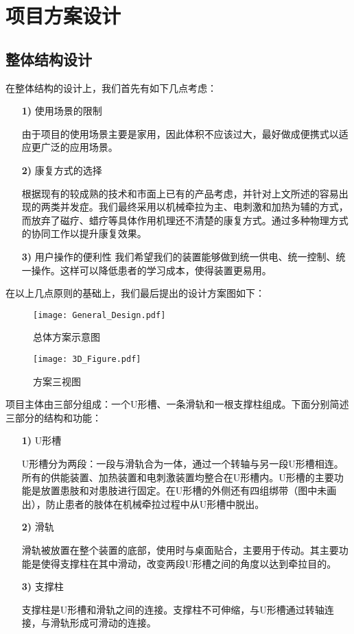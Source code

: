\documentclass[UTF8]{ctexart}
\begin{document}
\section{项目方案设计}
    \subsection{整体结构设计}
        在整体结构的设计上，我们首先有如下几点考虑：
        \begin{enumerate}
            \item[\textbf{1)}]使用场景的限制
            
            由于项目的使用场景主要是家用，因此体积不应该过大，最好做成便携式以适应更广泛的应用场景。
            \item[\textbf{2)}]康复方式的选择
            
            根据现有的较成熟的技术和市面上已有的产品考虑，并针对上文所述的容易出现的两类并发症。我们最终采用以机械牵拉为主、电刺激和加热为辅的方式，而放弃了磁疗、蜡疗等具体作用机理还不清楚的康复方式。通过多种物理方式的协同工作以提升康复效果。
            
            \item[\textbf{3)}]用户操作的便利性
                我们希望我们的装置能够做到统一供电、统一控制、统一操作。这样可以降低患者的学习成本，使得装置更易用。 
        \end{enumerate}
        在以上几点原则的基础上，我们最后提出的设计方案图如下：
        \begin{figure}[H]
            \centering
            \texttt{[image: General\_Design.pdf]}
            \caption{总体方案示意图}
            \label{General}
        \end{figure}
        \begin{figure}[H]
            \centering
            \texttt{[image: 3D\_Figure.pdf]}
            \caption{方案三视图}
        \end{figure}
        项目主体由三部分组成：一个U形槽、一条滑轨和一根支撑柱组成。下面分别简述三部分的结构和功能：
        \begin{enumerate}
            \item[\textbf{1)}]U形槽

                U形槽分为两段：一段与滑轨合为一体，通过一个转轴与另一段U形槽相连。所有的供能装置、加热装置和电刺激装置均整合在U形槽内。U形槽的主要功能是放置患肢和对患肢进行固定。在U形槽的外侧还有四组绑带（图中未画出），防止患者的肢体在机械牵拉过程中从U形槽中脱出。

            \item[\textbf{2)}]滑轨

                滑轨被放置在整个装置的底部，使用时与桌面贴合，主要用于传动。其主要功能是使得支撑柱在其中滑动，改变两段U形槽之间的角度以达到牵拉目的。
            \item[\textbf{3)}]支撑柱  

                支撑柱是U形槽和滑轨之间的连接。支撑柱不可伸缩，与U形槽通过转轴连接，与滑轨形成可滑动的连接。
        \end{enumerate}
        
\end{document}
